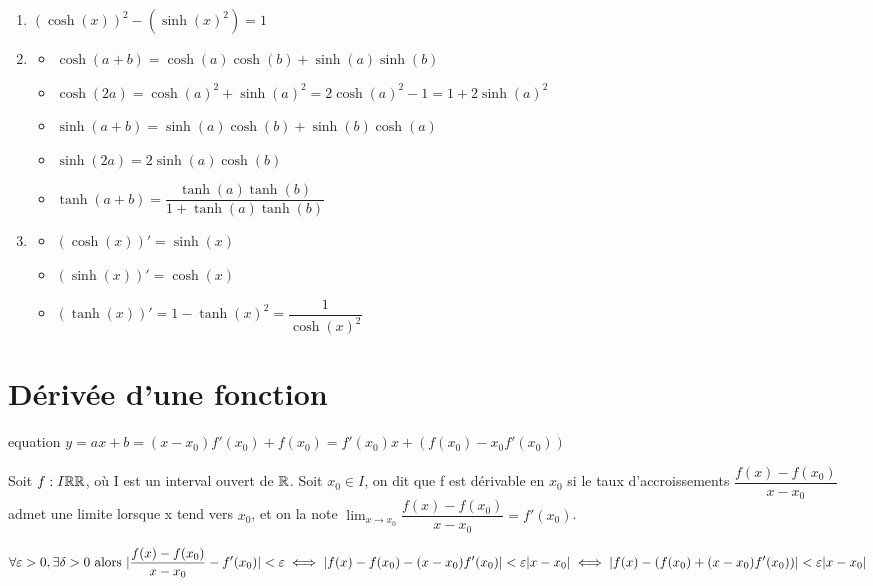 \documentclass[a4paper, 12pt]{article}
\begin{document}
\begin{proprietes}
    \begin{enumerate}
        \item $(\cosh(x))^2 - (\sinh(x)^2) = 1$
        \item \begin{itemize}
            \item $\cosh(a+b) = \cosh(a) \cosh(b) + \sinh(a) \sinh(b)$
            \item $\cosh(2a) = \cosh(a)^2 + \sinh(a)^2 = 2 \cosh(a)^2 - 1 = 1 + 2 \sinh(a)^2$
            \item $\sinh(a+b) = \sinh(a)\cosh(b) + \sinh(b)\cosh(a)$
            \item $\sinh(2a) = 2\sinh(a)\cosh(b)$
            \item $\tanh(a+b) = \dfrac{\tanh(a) \tanh(b)}{1 + \tanh(a) \tanh(b)}$
        \end{itemize}
        \item \begin{itemize}
            \item $(\cosh(x))' = \sinh(x)$
            \item $(\sinh(x))' = \cosh(x)$
            \item $(\tanh(x))' = 1 - \tanh(x)^2 = \dfrac{1}{\cosh(x)^2}$
        \end{itemize}
    \end{enumerate}
\end{proprietes}




\section{Dérivée d'une fonction}

equation $y = ax + b = (x - x_0)f'(x_0) + f(x_0) = f'(x_0)x + (f(x_0) - x_0f'(x_0))$

\begin{definition}
    Soit $f: I \mathbb{R} \mathbb{R}$, où I est un interval ouvert de $\mathbb{R}$.
    Soit $x_0 \in I$, on dit que f est dérivable en $x_0$ si le taux d'accroissements
    $\dfrac{f(x)-f(x_0)}{x - x_0}$ admet une limite lorsque x tend vers $x_0$,
    et on la note $\lim_{x \to x_0}\dfrac{f(x) - f(x_0)}{x - x_0} = f'(x_0)$.

    $$
    \forall \varepsilon > 0, \exists \delta > 0 \text{ alors } |\dfrac{f(x) - f(x_0)}{x - x_0} - f'(x_0)| < \varepsilon \iff |f(x) - f(x_0) - (x - x_0)f'(x_0)| < \varepsilon |x - x_0| \iff |f(x) - (f(x_0) + (x - x_0)f'(x_0))| < \varepsilon |x - x_0|
    $$
\end{definition}
\end{document}

